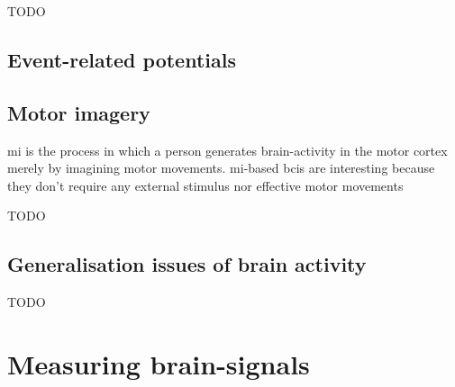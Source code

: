 TODO


\subsection{Event-related potentials}
\label{subsec:biomedical_signals_brain_signals_erp}



\subsection{Motor imagery}
\label{subsec:biomedical_signals_brain_signals_mi}

\Gls{mi} is the process in which a person generates brain-activity in the motor cortex merely by imagining motor movements.
\Gls{mi}-based \glspl{bci} are interesting because they don't require any external stimulus nor effective motor movements

TODO


\subsection{Generalisation issues of brain activity}
\label{subsec:biomedical_signals_brain_signals_generalisation}



TODO


\section{Measuring brain-signals}
\label{sec:biomedical_signals_measuring}



